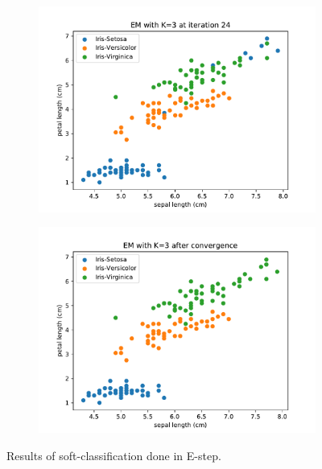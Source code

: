 \documentclass{article}
\begin{document}
\begin{figure}[!ht]
{\begin{subfigure}{0.6\textwidth}
	\includegraphics[width=\textwidth]{./Figures/2_2_EM_iter24}
	\end{subfigure}
	\begin{subfigure}{0.6\textwidth}
	\includegraphics[width=\textwidth]{./Figures/2_2_EM_converged}
	\end{subfigure}
	}	
	\caption{Results of soft-classification done in E-step.}
	\label{2_2_EM_iter}
\end{figure}
\end{document}
